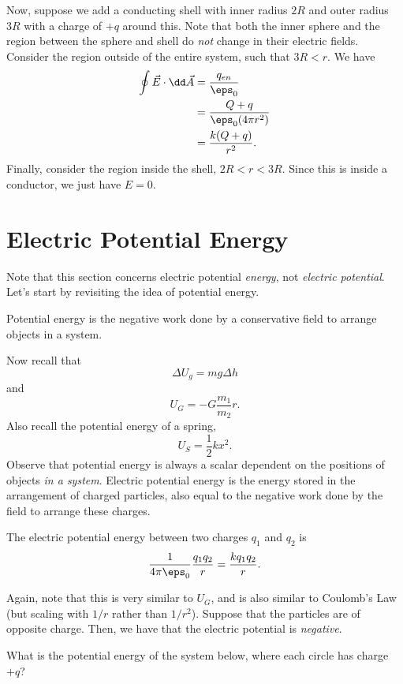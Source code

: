 \documentclass[11pt]{article}
\begin{document}
Now, suppose we add a conducting shell with inner radius $2R$ and outer radius $3R$ with a charge of $+q$ around this. Note that both the inner sphere and the region between the sphere and shell do \textit{not} change in their electric fields. Consider the region outside of the entire system, such that $3R < r$. We have
\begin{align*}
	\oint \vec{E} \cdot \dd \vec{A} &= \frac{q_{en}}{\eps_0} \\
	&= \frac{Q+q}{\eps_0 (4\pi r^2)}	 \\
	&= \frac{k(Q+q)}{r^2}.
\end{align*}
Finally, consider the region inside the shell, $2R < r < 3R$. Since this is inside a conductor, we just have $E = 0$.

\section{Electric Potential Energy}
Note that this section concerns electric potential \textit{energy}, not \textit{electric potential}. Let's start by revisiting the idea of potential energy.
\begin{defn}
	Potential energy is the negative work done by a conservative field to arrange objects in a system.
\end{defn}
Now recall that
\[\Delta U_{g} = mg\Delta h\]
and
\[U_G = -G\frac{m_1}{m_2}{r}.\]
Also recall the potential energy of a spring,
\[U_S = \frac{1}{2}kx^2.\]
Observe that potential energy is always a scalar dependent on the positions of objects \textit{in a system}. Electric potential energy is the energy stored in the arrangement of charged particles, also equal to the negative work done by the field to arrange these charges.
\begin{defn}
	The electric potential energy between two charges $q_1$ and $q_2$ is
	\[\frac{1}{4\pi\eps_0}\frac{q_1q_2}{r} = \frac{kq_1q_2}{r}.\]
\end{defn}
Again, note that this is very similar to $U_G$, and is also similar to Coulomb's Law (but scaling with $1/r$ rather than $1/r^2$). Suppose that the particles are of opposite charge. Then, we have that the electric potential is \textit{negative}.
\begin{example}\label{electricpotentialenergyex1}
	What is the potential energy of the system below, where each circle has charge $+q$?
\end{example}
\end{document}
